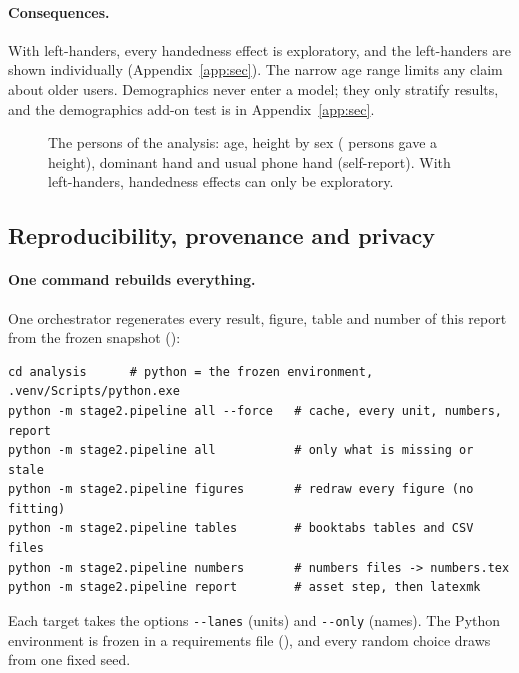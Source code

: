 \paragraph{Consequences.} With  left-handers, every handedness effect is exploratory, and the left-handers
are shown individually (Appendix~\ref{app:sec}). The narrow age range limits any claim about older users.
Demographics never enter a model; they only stratify results, and the demographics add-on test is in
Appendix~\ref{app:sec}.

\begin{figure}[htbp]
\centering
{}
\caption{The  persons of the analysis: age, height by sex ( persons
gave a height), dominant hand and usual phone hand (self-report). With  left-handers,
handedness effects can only be exploratory.}
\label{fig:S2_01_demographics}
\end{figure}

\subsection{Reproducibility, provenance and privacy}\label{app:data:repro}

\paragraph{One command rebuilds everything.} One orchestrator regenerates every result, figure, table and
number of this report from the frozen snapshot ():
\begin{small}
\begin{verbatim}
cd analysis      # python = the frozen environment, .venv/Scripts/python.exe
python -m stage2.pipeline all --force   # cache, every unit, numbers, report
python -m stage2.pipeline all           # only what is missing or stale
python -m stage2.pipeline figures       # redraw every figure (no fitting)
python -m stage2.pipeline tables        # booktabs tables and CSV files
python -m stage2.pipeline numbers       # numbers files -> numbers.tex
python -m stage2.pipeline report        # asset step, then latexmk
\end{verbatim}
\end{small}
Each target takes the options \texttt{-{}-lanes} (units) and \texttt{-{}-only} (names). The Python environment is
frozen in a requirements file (), and every random choice draws from one fixed
seed.


